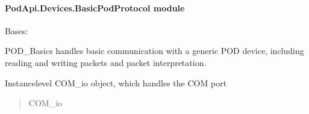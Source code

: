 \documentclass[letterpaper,10pt,english]{sphinxmanual}
\begin{document}
\paragraph{PodApi.Devices.BasicPodProtocol module}
\label{\detokenize{PodApi.Devices:module-PodApi.Devices.BasicPodProtocol}}\label{\detokenize{PodApi.Devices:podapi-devices-basicpodprotocol-module}}

\begin{fulllineitems}
\label{\detokenize{PodApi.Devices:PodApi.Devices.BasicPodProtocol.Pod}}
\pysigstartsignatures
{}
\pysigstopsignatures
\sphinxAtStartPar
Bases: 

\sphinxAtStartPar
POD\_Basics handles basic communication with a generic POD device, including reading and writing
packets and packet interpretation.

\begin{fulllineitems}
\label{\detokenize{PodApi.Devices:PodApi.Devices.BasicPodProtocol.Pod._port}}
\pysigstartsignatures
{}
\pysigstopsignatures
\sphinxAtStartPar
Instance\sphinxhyphen{}level COM\_io object, which handles the COM port
\begin{quote}\begin{description}
\sphinxAtStartPar
COM\_io

\end{description}\end{quote}

\end{fulllineitems}


\end{fulllineitems}
\end{document}
